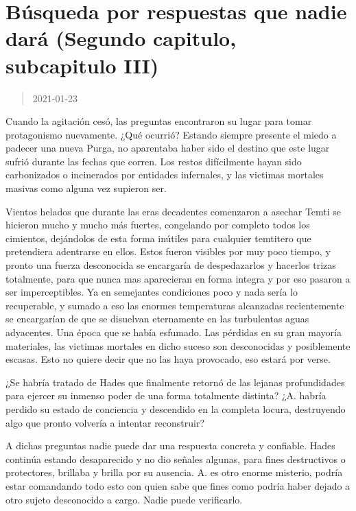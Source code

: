 \documentclass[
  spanish,
]{book}
\begin{document}
\hypertarget{buxfasqueda-por-respuestas-que-nadie-daruxe1-segundo-capitulo-subcapitulo-iii}{%
\section{Búsqueda por respuestas que nadie dará (Segundo capitulo, subcapitulo III)}\label{buxfasqueda-por-respuestas-que-nadie-daruxe1-segundo-capitulo-subcapitulo-iii}}

\begin{quote}
2021-01-23
\end{quote}

Cuando la agitación cesó, las preguntas encontraron su lugar para tomar protagonismo nuevamente. ¿Qué ocurrió? Estando siempre presente el miedo a padecer una nueva Purga, no aparentaba haber sido el destino que este lugar sufrió durante las fechas que corren. Los restos difícilmente hayan sido carbonizados o incinerados por entidades infernales, y las victimas mortales masivas como alguna vez supieron ser.

Vientos helados que durante las eras decadentes comenzaron a asechar Temti se hicieron mucho y mucho más fuertes, congelando por completo todos los cimientos, dejándolos de esta forma inútiles para cualquier temtitero que pretendiera adentrarse en ellos. Estos fueron visibles por muy poco tiempo, y pronto una fuerza desconocida se encargaría de despedazarlos y hacerlos trizas totalmente, para que nunca mas aparecieran en forma integra y por eso pasaron a ser imperceptibles. Ya en semejantes condiciones poco y nada sería lo recuperable, y sumado a eso las enormes temperaturas alcanzadas recientemente se encargarían de que se disuelvan eternamente en las turbulentas aguas adyacentes. Una época que se había esfumado. Las pérdidas en su gran mayoría materiales, las victimas mortales en dicho suceso son desconocidas y posiblemente escasas. Esto no quiere decir que no las haya provocado, eso estará por verse.

¿Se habría tratado de Hades que finalmente retornó de las lejanas profundidades para ejercer su inmenso poder de una forma totalmente distinta? ¿A. habría perdido su estado de conciencia y descendido en la completa locura, destruyendo algo que pronto volvería a intentar reconstruir?

A dichas preguntas nadie puede dar una respuesta concreta y confiable. Hades continúa estando desaparecido y no dio señales algunas, para fines destructivos o protectores, brillaba y brilla por su ausencia. A. es otro enorme misterio, podría estar comandando todo esto con quien sabe que fines como podría haber dejado a otro sujeto desconocido a cargo. Nadie puede verificarlo.
\end{document}
